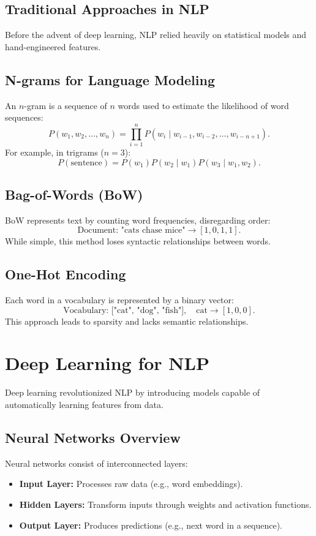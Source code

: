 \subsection{Traditional Approaches in NLP}
Before the advent of deep learning, NLP relied heavily on statistical models and hand-engineered features.

\subsection{N-grams for Language Modeling}
An \(n\)-gram is a sequence of \(n\) words used to estimate the likelihood of word sequences:
\[
P(w_1, w_2, \ldots, w_n) = \prod_{i=1}^{n} P(w_i \mid w_{i-1}, w_{i-2}, \ldots, w_{i-n+1}).
\]
For example, in trigrams (\(n=3\)):
\[
P(\text{sentence}) = P(w_1) P(w_2 \mid w_1) P(w_3 \mid w_1, w_2).
\]

\subsection{Bag-of-Words (BoW)}
BoW represents text by counting word frequencies, disregarding order:
\[
\text{Document: "cats chase mice"} \to [1, 0, 1, 1].
\]
While simple, this method loses syntactic relationships between words.

\subsection{One-Hot Encoding}
Each word in a vocabulary is represented by a binary vector:
\[
\text{Vocabulary: ["cat", "dog", "fish"]}, \quad \text{cat} \to [1, 0, 0].
\]
This approach leads to sparsity and lacks semantic relationships.

\section{Deep Learning for NLP}
Deep learning revolutionized NLP by introducing models capable of automatically learning features from data.

\subsection{Neural Networks Overview}
Neural networks consist of interconnected layers:
\begin{itemize}
    \item \textbf{Input Layer:} Processes raw data (e.g., word embeddings).
    \item \textbf{Hidden Layers:} Transform inputs through weights and activation functions.
    \item \textbf{Output Layer:} Produces predictions (e.g., next word in a sequence).
\end{itemize}

